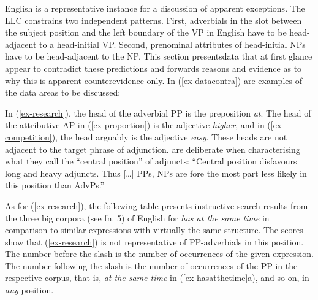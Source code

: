 \documentclass[output=paper
  ,nobabel
  ,uniformtopskip %
]{langscibook}
\begin{document}
English is a representative instance for a discussion of apparent exceptions. The LLC constrains two independent patterns. First, adverbials in the slot between the subject position and the left boundary of the VP in English have to be head-adjacent to a head-initial VP. Second, prenominal attributes of head-initial NPs have to be head-adjacent to the NP. This section presents\pagebreak data that at first glance appear to contradict these predictions and forwards reasons and evidence as to why this is apparent counterevidence only. In (\ref{ex-datacontra}) are examples of the data areas to be discussed:

\eal\label{ex-datacontra}
\label{ex-research}

\label{ex-proportion}

\label{ex-competition}

\zl

\noindent
In (\ref{ex-research}), the head of the adverbial PP is the preposition \emph{at}. The head of the attributive AP in (\ref{ex-proportion}) is the adjective \emph{higher}, and in (\ref{ex-competition}), the head arguably is the adjective \emph{easy}. These heads are not adjacent to the target phrase of adjunction. \citet*[780]{HuddlestonPullum2002} are deliberate when characterising what they call the ``central position'' of adjuncts: ``Central position disfavours long and heavy adjuncts. Thus [\ldots] PPs, NPs are fore the most part less likely in this position than AdvPs.''

As for (\ref{ex-research}), the following table presents instructive search results from the three big corpora (see fn. 5) of English for \emph{has at the same time} in comparison to similar expressions with virtually the same structure. The scores show that (\ref{ex-research}) is not representative of PP-adverbials in this position. The number before the slash is the number of occurrences of the given expression. The number following the slash is the number of occurrences of the PP in the respective corpus, that is, \emph{at the same time} in (\ref{ex-hasatthetime}a), and so on, in \emph{any} position.
\end{document}
